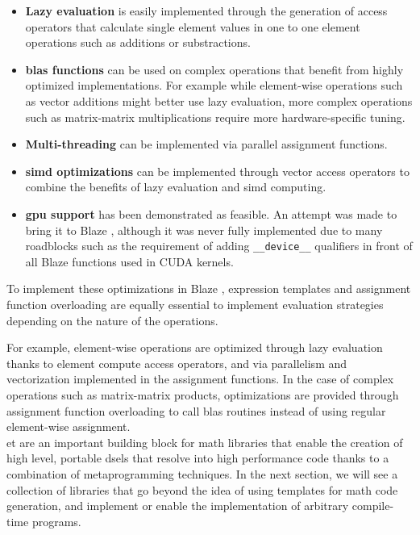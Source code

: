\documentclass[../main]{subfiles}
\begin{document}
\begin{itemize}

\item
\textbf{Lazy evaluation} is easily implemented through the generation
of access operators that calculate single element values in one to one
element operations such as additions or substractions.

\item
\textbf{\gls{blas} functions} can be used on complex operations that
benefit from highly optimized implementations. For example while
element-wise operations such as vector additions might better use
lazy evaluation, more complex operations such as matrix-matrix multiplications
require more hardware-specific tuning.

\item
\textbf{Multi-threading} can be implemented via parallel assignment functions.

\item
\textbf{\gls{simd} optimizations} can be implemented through vector access
operators to combine the benefits of lazy evaluation and \gls{simd} computing.

\item
\textbf{\gls{gpu} support} has been demonstrated as feasible.
An attempt was made to bring it to Blaze \cite{blaze_cuda},
although it was never fully implemented due to many roadblocks such as
the requirement of adding \lstinline{__device__} qualifiers in front of
all Blaze functions used in CUDA kernels.

\end{itemize}

To implement these optimizations in Blaze \cite{blazelib},
expression templates and assignment function overloading are equally essential
to implement evaluation strategies depending on the nature of the operations.

For example, element-wise operations are optimized through lazy evaluation
thanks to element compute access operators, and via parallelism
and vectorization implemented in the assignment functions.
In the case of complex operations such as matrix-matrix products,
optimizations are provided through assignment function overloading
to call \gls{blas} routines instead of using regular element-wise assignment.
\\

\acrlong{et} are an important building block for \cpp math libraries that
enable the creation of high level, portable \glspl{dsel} that resolve into
high performance code thanks to a combination of metaprogramming techniques.
In the next section, we will see a collection of libraries that go beyond the
idea of using templates for math code generation, and implement or enable the
implementation of arbitrary compile-time programs.
\end{document}
